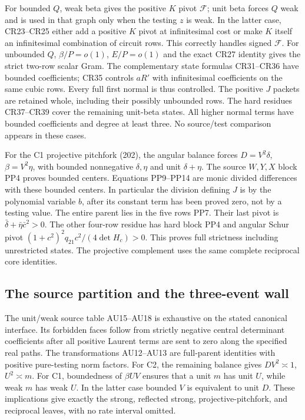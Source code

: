For bounded $Q$, weak beta gives the positive $K$ pivot
$\mathcal F$; unit beta forces $Q$ weak and is used in that
graph only when the testing $z$ is weak.  In the latter case,
CR23--CR25 either add a positive $K$ pivot at infinitesimal
cost or make $K$ itself an infinitesimal combination of circuit
rows.  This correctly handles signed $\mathcal F$.
For unbounded $Q$, $\beta/P=o(1)$, $E/P=o(1)$ and the
exact CR27 identity gives the strict two-row scalar Gram.
The complementary state formulas CR31--CR36 have bounded
coefficients; CR35 controls $aR'$ with infinitesimal coefficients
on the same cubic rows.  Every full first normal is thus
controlled.  The positive $J$ packets are retained whole,
including their possibly unbounded rows.  The hard residues
CR37--CR39 cover the remaining unit-beta states.  All higher
normal terms have bounded coefficients and degree at least three.
No source/test comparison appears in these cases.

For the C1 projective pitchfork (202), the angular balance
forces $D=V^2\delta$, $\beta=V^2\eta$, with bounded
nonnegative $\delta,\eta$ and unit $\delta+\eta$.
The source $W,Y,X$ block PP4 proves bounded centers.
Equations PP9--PP14 are monic divided differences with these
bounded centers.  In particular the division defining $J$
is by the polynomial variable $b$, after its constant term
has been proved zero, not by a testing value.  The entire
parent lies in the five rows PP7.  Their last pivot is
$\bar\delta+\bar\eta\bar c^2>0$.  The other four-row
residue has hard block PP4 and angular Schur pivot
$(1+c^2)^2q_{21}c^2/(4\det H_c)>0$.  This proves full
strictness including unrestricted states.  The projective
complement uses the same complete reciprocal core identities.

\subsection{The source partition and the three-event wall}

The unit/weak source table AU15--AU18 is exhaustive on the
stated canonical interface.  Its forbidden faces follow from
strictly negative central determinant coefficients after all
positive Laurent terms are sent to zero along the specified
real paths.  The transformations AU12--AU13 are full-parent
identities with positive pure-testing norm factors.  For C2,
the remaining balance gives $DV^2\asymp1$, $U^2\asymp m$.
For C1, boundedness of $\beta UV$ ensures that a unit $m$
has unit $U$, while weak $m$ has weak $U$.  In the latter
case bounded $V$ is equivalent to unit $D$.  These implications
give exactly the strong, reflected strong, projective-pitchfork,
and reciprocal leaves, with no rate interval omitted.

